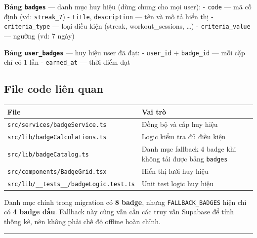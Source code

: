 \documentclass[12pt,a4paper]{article}
\newcounter{none}
\begin{document}
\textbf{Bảng \texttt{badges}} --- danh mục huy hiệu (dùng chung cho mọi
user): - \texttt{code} --- mã cố định (vd: \texttt{streak\_7}) -
\texttt{title}, \texttt{description} --- tên và mô tả hiển thị -
\texttt{criteria\_type} --- loại điều kiện (streak, workout\_sessions,
\ldots) - \texttt{criteria\_value} --- ngưỡng (vd: 7 ngày)

\textbf{Bảng \texttt{user\_badges}} --- huy hiệu user đã đạt: -
\texttt{user\_id} + \texttt{badge\_id} --- mỗi cặp chỉ có 1 lần -
\texttt{earned\_at} --- thời điểm đạt

\subsection{File code liên quan}\label{file-code-liuxean-quan-1}

{\def\LTcaptype{none} %
\begin{longtable}[]{@{}
  >{\raggedright\arraybackslash}p{}
  >{\raggedright\arraybackslash}p{}@{}}
\toprule\noalign{}
\begin{minipage}[b]{\linewidth}\raggedright
File
\end{minipage} & \begin{minipage}[b]{\linewidth}\raggedright
Vai trò
\end{minipage} \\
\midrule\noalign{}
\endhead
\bottomrule\noalign{}
\endlastfoot
\texttt{src/services/badgeService.ts} & Đồng bộ và cấp huy hiệu \\
\texttt{src/lib/badgeCalculations.ts} & Logic kiểm tra đủ điều kiện \\
\texttt{src/lib/badgeCatalog.ts} & Danh mục fallback 4 badge khi không
tải được bảng \texttt{badges} \\
\texttt{src/components/BadgeGrid.tsx} & Hiển thị lưới huy hiệu \\
\texttt{src/lib/\_\_tests\_\_/badgeLogic.test.ts} & Unit test logic huy
hiệu \\
\end{longtable}
}

Danh mục chính trong migration có \textbf{8 badge}, nhưng
\texttt{FALLBACK\_BADGES} hiện chỉ có \textbf{4 badge đầu}. Fallback này
cũng vẫn cần các truy vấn Supabase để tính thống kê, nên không phải chế
độ offline hoàn chỉnh.

\begin{center}\rule{0.5\linewidth}{0.5pt}\end{center}
\end{document}
